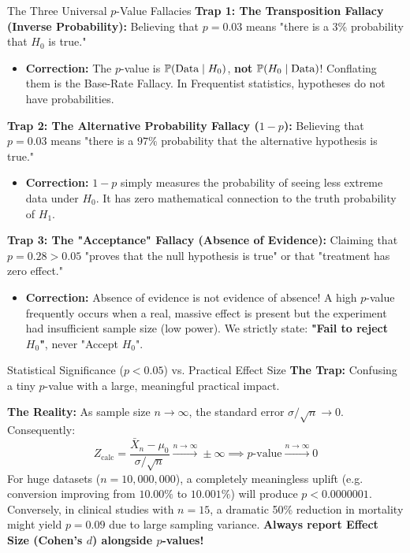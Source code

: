 \begin{trapbox}{The Three Universal $p$-Value Fallacies}
\textbf{Trap 1: The Transposition Fallacy (Inverse Probability):}
Believing that $p = 0.03$ means "there is a 3\% probability that $H_0$ is true."
\begin{itemize}
    \item \textbf{Correction:} The $p$-value is $\P(\text{Data} \mid H_0)$, \textbf{not} $\P(H_0 \mid \text{Data})$! Conflating them is the Base-Rate Fallacy. In Frequentist statistics, hypotheses do not have probabilities.
\end{itemize}

\textbf{Trap 2: The Alternative Probability Fallacy ($1 - p$):}
Believing that $p = 0.03$ means "there is a $97\%$ probability that the alternative hypothesis is true."
\begin{itemize}
    \item \textbf{Correction:} $1 - p$ simply measures the probability of seeing less extreme data under $H_0$. It has zero mathematical connection to the truth probability of $H_1$.
\end{itemize}

\textbf{Trap 3: The "Acceptance" Fallacy (Absence of Evidence):}
Claiming that $p = 0.28 > 0.05$ "proves that the null hypothesis is true" or that "treatment has zero effect."
\begin{itemize}
    \item \textbf{Correction:} Absence of evidence is not evidence of absence! A high $p$-value frequently occurs when a real, massive effect is present but the experiment had insufficient sample size (low power). We strictly state: \textbf{"Fail to reject $H_0$"}, never "Accept $H_0$".
\end{itemize}
\end{trapbox}

\begin{trapbox}{Statistical Significance ($p < 0.05$) vs. Practical Effect Size}
\textbf{The Trap:} Confusing a tiny $p$-value with a large, meaningful practical impact.

\textbf{The Reality:} As sample size $n \to \infty$, the standard error $\sigma/\sqrt{n} \to 0$. Consequently:
$$Z_{\text{calc}} = \frac{\bar{X}_n - \mu_0}{\sigma / \sqrt{n}} \xrightarrow{n \to \infty} \pm \infty \implies p\text{-value} \xrightarrow{n \to \infty} 0$$
For huge datasets ($n = 10,000,000$), a completely meaningless uplift (e.g. conversion improving from $10.00\%$ to $10.001\%$) will produce $p < 0.0000001$. Conversely, in clinical studies with $n = 15$, a dramatic 50\% reduction in mortality might yield $p = 0.09$ due to large sampling variance. \textbf{Always report Effect Size (Cohen's $d$) alongside $p$-values!}
\end{trapbox}


